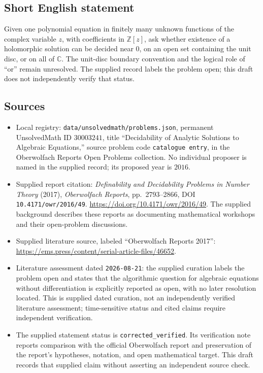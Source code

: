 \documentclass[11pt]{article}
\newcommand{\Z}{\mathbb{Z}}
\newcommand{\C}{\mathbb{C}}
\begin{document}
\subsection{Short English statement}
Given one polynomial equation in finitely many unknown functions of the complex variable \(z\), with coefficients in \(\Z[z]\), ask whether existence of a holomorphic solution can be decided near \(0\), on an open set containing the unit disc, or on all of \(\C\). The unit-disc boundary convention and the logical role of ``or'' remain unresolved. The supplied record labels the problem open; this draft does not independently verify that status.
\subsection{Sources}
\begin{itemize}
\item Local registry: \texttt{data/unsolvedmath/problems.json}, permanent UnsolvedMath ID \(30003241\), title ``Decidability of Analytic Solutions to Algebraic Equations,'' source problem code \texttt{catalogue entry}, in the Oberwolfach Reports Open Problems collection. No individual proposer is named in the supplied record; its proposed year is \(2016\).
\item Supplied report citation: \emph{Definability and Decidability Problems in Number Theory} (2017), \emph{Oberwolfach Reports}, pp.\ 2793--2866, DOI \texttt{10.4171/owr/2016/49}. \url{https://doi.org/10.4171/owr/2016/49}. The supplied background describes these reports as documenting mathematical workshops and their open-problem discussions.
\item Supplied literature source, labeled ``Oberwolfach Reports 2017'': \url{https://ems.press/content/serial-article-files/46652}.
\item Literature assessment dated \texttt{2026-08-21}: the supplied curation labels the problem open and states that the algorithmic question for algebraic equations without differentiation is explicitly reported as open, with no later resolution located. This is supplied dated curation, not an independently verified literature assessment; time-sensitive status and cited claims require independent verification.
\item The supplied statement status is \texttt{corrected\_verified}. Its verification note reports comparison with the official Oberwolfach report and preservation of the report's hypotheses, notation, and open mathematical target. This draft records that supplied claim without asserting an independent source check.
\end{itemize}
\end{document}
